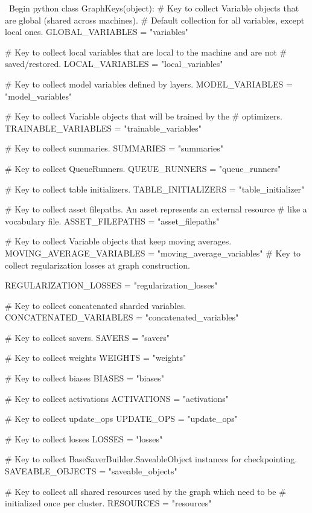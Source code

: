 \begin{content}
\begin{leftbar}
\ Begin {python}
class GraphKeys(object):
  # Key to collect Variable objects that are global (shared across machines).
  # Default collection for all variables, except local ones.
  GLOBAL_VARIABLES = "variables"

  # Key to collect local variables that are local to the machine and are not
  # saved/restored.
  LOCAL_VARIABLES = "local_variables"

  # Key to collect model variables defined by layers.
  MODEL_VARIABLES = "model_variables"

  # Key to collect Variable objects that will be trained by the
  # optimizers.
  TRAINABLE_VARIABLES = "trainable_variables"

  # Key to collect summaries.
  SUMMARIES = "summaries"

  # Key to collect QueueRunners.
  QUEUE_RUNNERS = "queue_runners"

  # Key to collect table initializers.
  TABLE_INITIALIZERS = "table_initializer"

  # Key to collect asset filepaths. An asset represents an external resource
  # like a vocabulary file.
  ASSET_FILEPATHS = "asset_filepaths"

  # Key to collect Variable objects that keep moving averages.
  MOVING_AVERAGE_VARIABLES = "moving_average_variables"
  # Key to collect regularization losses at graph construction.

  REGULARIZATION_LOSSES = "regularization_losses"

  # Key to collect concatenated sharded variables.
  CONCATENATED_VARIABLES = "concatenated_variables"

  # Key to collect savers.
  SAVERS = "savers"

  # Key to collect weights
  WEIGHTS = "weights"

  # Key to collect biases
  BIASES = "biases"

  # Key to collect activations
  ACTIVATIONS = "activations"

  # Key to collect update\_ops
  UPDATE_OPS = "update_ops"

  # Key to collect losses
  LOSSES = "losses"

  # Key to collect BaseSaverBuilder.SaveableObject instances for checkpointing.
  SAVEABLE_OBJECTS = "saveable_objects"

  # Key to collect all shared resources used by the graph which need to be
  # initialized once per cluster.
  RESOURCES = "resources"


\end{leftbar}
\end{content}
